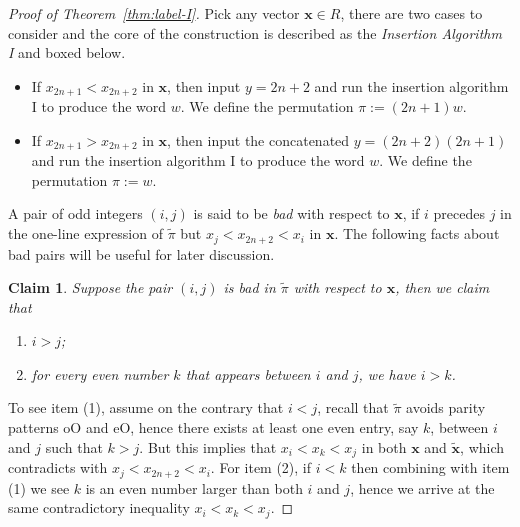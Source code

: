 \documentclass[11pt,reqno]{amsart}
\numberwithin{equation}{section}
\theoremstyle{plain}
\newtheorem{claim}[theorem]{Claim}
\theoremstyle{definition}
\newcommand{\bx}{\mathbf{x}}
\def\oO{\mathrm{oO}}
\def\eO{\mathrm{eO}}
\begin{document}
\begin{proof}[Proof of Theorem~\ref{thm:label-I}]
 	Pick any vector $\bx\in R$, there are two cases to consider and the core of the construction is described as the {\it Insertion Algorithm I} and boxed below.
 	\begin{itemize}
 		\item If $x_{2n+1}<x_{2n+2}$ in $\bx$, then input $y=2n+2$ and run the insertion algorithm I to produce the word $w$. We define the permutation $\pi:=(2n+1)w$.
 		\item If $x_{2n+1}>x_{2n+2}$ in $\bx$, then input the concatenated $y=(2n+2)(2n+1)$ and run the insertion algorithm I to produce the word $w$. We define the permutation $\pi:=w$.
 	\end{itemize}
 	
 	A pair of odd integers $(i,j)$ is said to be {\it bad} with respect to $\bx$, if $i$ precedes $j$ in the one-line expression of $\tilde{\pi}$ but $x_j<x_{2n+2}<x_i$ in $\bx$. The following facts about bad pairs will be useful for later discussion.

 	\begin{claim}\label{cla:bad pair}
 	Suppose the pair $(i,j)$ is bad in $\tilde{\pi}$ with respect to $\bx$, then we claim that
 	\begin{enumerate}
 		\item $i>j$;
 		\item for every even number $k$ that appears between $i$ and $j$, we have $i>k$.
 	\end{enumerate}
 	\end{claim}

 	To see item (1), assume on the contrary that $i<j$, recall that $\tilde{\pi}$ avoids parity patterns $\oO$ and $\eO$, hence there exists at least one even entry, say $k$, between $i$ and $j$ such that $k>j$. But this implies that $x_i<x_k<x_j$ in both $\bx$ and $\tilde{\bx}$, which contradicts with $x_j<x_{2n+2}<x_i$. For item (2), if $i<k$ then combining with item (1) we see $k$ is an even number larger than both $i$ and $j$, hence we arrive at the same contradictory inequality $x_i<x_k<x_j$.


\end{proof}
\end{document}

